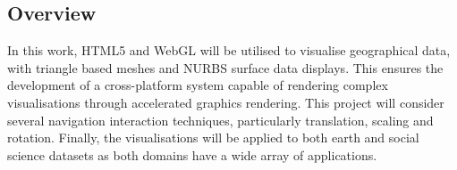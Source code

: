 \documentclass[
	fontsize=11pt
	headlines=2,
	footlines=2,
	parskip=half
]{scrartcl}
\begin{document}
{		%

		\subsection{Overview} {

			In this work, HTML5 and WebGL will be utilised to visualise geographical data, with triangle based meshes and NURBS surface data displays. This ensures the development of a cross-platform system capable of rendering complex visualisations through accelerated graphics rendering. This project will consider several navigation interaction techniques, particularly translation, scaling and rotation. Finally, the visualisations will be applied to both earth and social science datasets as both domains have a wide array of applications.

		}
	
	}
	
\end{document}
